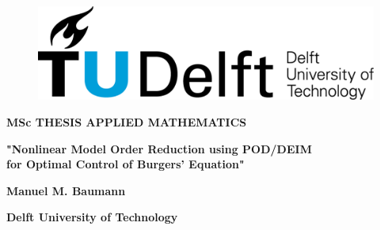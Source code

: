 \begin{figure}[h]
  \hfill
  \begin{minipage}[t]{1\linewidth}
       \includegraphics[scale=0.23]{logo_tudelft.png}
    \end{minipage}
  \hfill
\end{figure}
\begin{center}

\textsf{\textbf{MSc THESIS APPLIED MATHEMATICS}}

\hspace{0.5cm}

\qquad

\begin{LARGE}
\textbf{\textsf{"Nonlinear Model Order Reduction using POD/DEIM \\ for Optimal Control of Burgers' Equation"}}
\end{LARGE}

\qquad

\hspace{0.5cm}

\begin{LARGE}
\textbf{\textsf{Manuel M. Baumann}}
\end{LARGE}

\hspace{0.5cm}

\textbf{\large{\textsf{Delft University of Technology}}}

\qquad

\qquad

\qquad

\qquad

\qquad

\qquad

\qquad

\qquad

\qquad

\qquad

\qquad

\qquad

\qquad

\qquad

\qquad

\qquad
\end{center}
